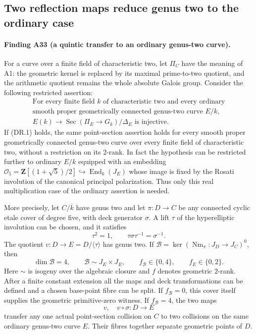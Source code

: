 \subsection{Two reflection maps reduce genus two to the ordinary case}
\label{sec:quintic-ordinary-reduction}

\paragraph{Finding A33 (a quintic transfer to an ordinary genus-two curve).}
For a curve over a finite field of characteristic two, let $\Pi_C$ have
the meaning of A1: the geometric kernel is replaced by its maximal
prime-to-two quotient, and the arithmetic quotient remains the whole
absolute Galois group.  Consider the following restricted assertion:
\[
 \begin{gathered}
 \text{For every finite field $k$ of characteristic two and every ordinary}\\
 \text{smooth proper geometrically connected genus-two curve $E/k$,}\\
 E(k)\longrightarrow\operatorname{Sec}(\Pi_E\to G_k)/\Delta_E
 \text{ is injective.}
 \end{gathered}
 \tag{DR.1}
\]
If (DR.1) holds, the same point-section assertion holds for every
smooth proper geometrically connected genus-two curve over every finite
field of characteristic two, without a restriction on its $2$-rank.
In fact the hypothesis can be restricted further to ordinary $E/k$
equipped with an embedding
$\mathcal O_5=\mathbf Z[(1+\sqrt5)/2]\hookrightarrow
\operatorname{End}_k(J_E)$ whose image is fixed by the Rosati involution
of the canonical principal polarization.  Thus only this real
multiplication case of the ordinary assertion is needed.

More precisely, let $C/\overline k$ have genus two and let
$\pi:D\to C$ be any connected cyclic etale cover of degree five, with
deck generator $\sigma$.  A lift $\tau$ of the hyperelliptic involution
can be chosen, and it satisfies
\[
 \tau^2=1,\qquad \tau\sigma\tau^{-1}=\sigma^{-1}.
 \tag{DR.2}
\]
The quotient $v:D\to E=D/\langle\tau\rangle$ has genus two.  If
$\mathcal B=\ker(\operatorname{Nm}_\pi:J_D\to J_C)^0$, then
\[
 \dim\mathcal B=4,\qquad
 \mathcal B\sim J_E\times J_E,\qquad
 f_{\mathcal B}\in\{0,4\},\qquad f_E\in\{0,2\}.
 \tag{DR.3}
\]
Here $\sim$ is isogeny over the algebraic closure and $f$ denotes
geometric $2$-rank.  After a finite constant extension all the maps and
deck transformations can be defined and a chosen base-point fibre can
be split.  If $f_{\mathcal B}=0$, this cover itself supplies the
geometric primitive-zero witness.  If $f_{\mathcal B}=4$, the two maps
\[
                         v,\quad v\circ\sigma:D\longrightarrow E
 \tag{DR.4}
\]
transfer any one actual point-section collision on $C$ to two collisions
on the same ordinary genus-two curve $E$.  Their fibres together
separate geometric points of $D$.

